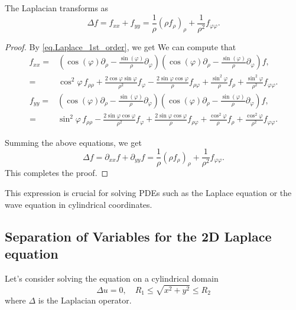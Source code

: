 \begin{proposition}[]
The Laplacian transforms as
\begin{equation}\label{eq.Laplace_2nd_order}
    \Delta f = f_{xx} + f_{yy} = \frac{1}{\rho} ( \rho f_\rho)_\rho + \frac{1}{\rho^2} f_{\varphi\varphi}.
\end{equation}
\end{proposition}
\begin{proof} By \eqref{eq.Laplace_1st_order}, we get
We can compute that
\begin{equation}
\begin{split}
    f_{xx}=&\left(\cos(\varphi) \partial_\rho - \frac{\sin(\varphi)}{\rho} \partial_\varphi\right)\left(\cos(\varphi) \partial_\rho - \frac{\sin(\varphi)}{\rho} \partial_\varphi\right)f,
    \\
    =&\cos ^2 \varphi\, f_{\rho\rho}+\frac{2 \cos \varphi \sin \varphi}{\rho^2} f_{\varphi}-\frac{2 \sin \varphi \cos \varphi}{\rho} f_{\rho\varphi}+\frac{\sin ^2 \varphi}{\rho} f_{\rho}+\frac{\sin ^2 \varphi}{\rho^2} f_{\varphi\varphi}. 
\end{split}
\end{equation}
\begin{equation}
\begin{split}
    f_{yy}=&\left(\cos(\varphi) \partial_\rho - \frac{\sin(\varphi)}{\rho} \partial_\varphi\right)\left(\cos(\varphi) \partial_\rho - \frac{\sin(\varphi)}{\rho} \partial_\varphi\right)f,
    \\
    =&\sin ^2 \varphi\, f_{\rho\rho}-\frac{2 \sin \varphi \cos \varphi}{\rho^2} f_{\varphi}+\frac{2 \sin \varphi \cos \varphi}{\rho} f_{\rho\varphi}+\frac{\cos ^2 \varphi}{\rho} f_{\rho}+\frac{\cos ^2 \varphi}{\rho^2} f_{\varphi\varphi}.
\end{split}
\end{equation}

Summing the above equations, we get
\begin{equation}
    \Delta f = \partial_{xx} f + \partial_{yy} f = \frac{1}{\rho} ( \rho f_\rho)_\rho + \frac{1}{\rho^2} f_{\varphi\varphi}.
\end{equation}
This completes the proof.
\end{proof}


This expression is crucial for solving PDEs such as the Laplace equation or the wave equation in cylindrical coordinates.

\subsection{Separation of Variables for the 2D Laplace equation}
Let's consider solving the equation on a cylindrical domain
\begin{equation} 
    \Delta u = 0, \quad R_1 \leq \sqrt{x^2+y^2} \leq R_2
\end{equation}
where $\Delta$ is the Laplacian operator.

